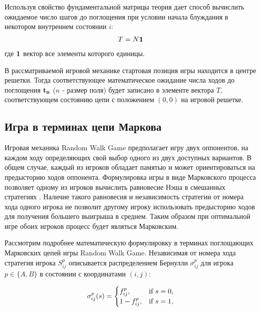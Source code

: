 Используя свойство фундаментальной матрицы теория дает способ вычислить ожидаемое число шагов до поглощения
при условии начала блуждания в некотором внутреннем состоянии $i$:
\begin{equation}
    \begin{aligned}
    T=N{\bf 1}
    \label{eq:T}
    \end{aligned}
\end{equation}
где ${\bf 1}$ вектор все элементы которого единицы.

В рассматриваемой игровой механике стартовая позиция игры находится в центре решетки. 
Тогда соответствующее математическое ожидание числа ходов до поглощения ${\rm \bf t_n}$ ($n$ - размер поля) 
будет записано в элементе вектора $T$, соответствующем состоянию цепи с положением $(0, 0)$ на игровой решетке.

\subsection{Игра в терминах цепи Маркова}\label{subsec:ch1/sec3/sub3}

Игровая механика Random Walk Game предполагает игру двух оппонентов, на каждом ходу определяющих свой выбор одного из двух доступных вариантов.
В общем случае, каждый из игроков обладает памятью и может ориентироваться на предысторию ходов оппонента.
Формулировка игры в виде Марковского процесса позволяет одному из игроков вычислить равновесие Нэша в смешанных стратегиях \cite{}.
Наличие такого равновесия и независимость стратегии от номера хода одного игрока не позволит другому игроку использовать предысторию ходов
для получения большего выигрыша в среднем. Таким образом при оптимальной игре обоих игроков процесс будет являться Марковским.

Рассмотрим подробнее математическую формулировку в терминах поглощающих Марковских цепей игры Random Walk Game.
Независимая от номера хода стратегия игрока $S_{ij}^p$ описывается распределением Бернулли $\sigma_{ij}^p$ для игрока 
$p \in \{A, B\}$ в состоянии с координатами $(i, j)$:

\begin{equation}
    \begin{aligned}
    {\bf \sigma}_{ij}^p(s)=
    \begin{cases}
        f_{ij}^p, &\mbox{if } s = 0,\\ 
        1-f_{ij}^p, &\mbox{if } s = 1,\\
    \end{cases}
    \label{eq:sigma}
    \end{aligned}
\end{equation}

